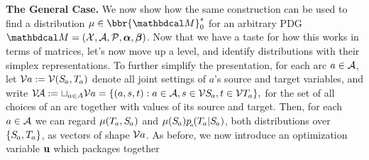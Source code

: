 \documentclass[twoside]{article}
\begin{document}
\endgroup

\textbf{The General Case.}
We now show how the same construction can be used to find
 a distribution $\mu \in \bbr{\dg M}^*_0$
for an arbitrary PDG $\dg M = (\X, \Ar, \mathcal P, \balpha, \bbeta)$.
{\color{gray}Now that we have a taste for how this works in terms of matrices,
let's now move up a level,
and identify distributions with their simplex representations.}
%
To further simplify the presentation,
for each arc $a \in \mathcal A$, let
$\V a := \V(\Src a, \Tgt a)$ 
denote all joint settings of $a$'s source and target variables, and 
write
$
\V\!\Ar :%
    = \sqcup_{a \in A} \V a
    = \{ (a, s, t) : a \in \Ar, s \in \V \Src a, t \in \V\Tgt a \},
$
for the set of all choices of an arc together with values of its source and target. 
%
Then, for each $a \in \mathcal A$ we can regard $\mu(\Tgt a, \Src a)$ and $\mu(\Src a)p\ssub a(\Tgt a | \Src a)$, both distributions over $\{\Src a,\Tgt a\}$, as vectors of shape $\mathcal V a$.
As before, we now introduce an optimization variable $\mathbf{u}$ which packages together
\end{document}
